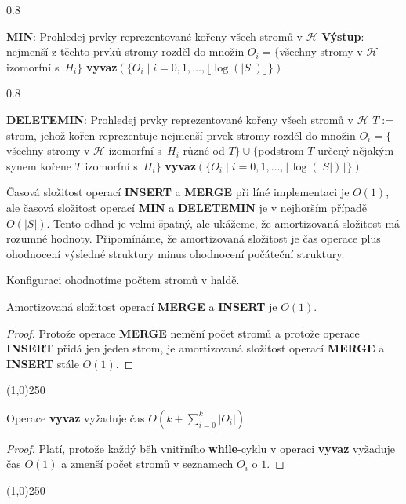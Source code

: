 \documentclass[a4paper,12pt]{article}
\newenvironment{myproof}{
  \begin{proof}
    
  }{
  \end{proof}
  \begin{center}
   \line(1,0){250}
   \end{center}
  }
\newcommand{\algoritmus}[1]{
  {
  \setlength\fboxrule{0.5pt}

  \begin{boxedminipage}{0.8\textwidth}

 #1
  \end{boxedminipage}

  }
  }
\begin{document}
\algoritmus{{\bf MIN}:\newline 
Prohledej prvky reprezentované kořeny všech 
stromů  
v $\mathcal H$\newline 
{\bf Výstup}: nejmenší z těchto prvků\newline 
stromy rozděl do množin $O_i=\{$všechny stromy v 
$\mathcal H$ izomorfní s~$H_i\}$\newline 
{\bf vyvaz$(\{O_i\mid i=0,1,\dots,\lfloor\log(|S|)\rfloor \})$}}

\algoritmus{{\bf
DELETEMIN}:\newline 
Prohledej prvky reprezentované kořeny všech 
stromů v $\mathcal H$\newline 
$T:=$ strom, jehož kořen repre\-zentuje nejmenší 
prvek\newline 
stromy rozděl do množin $O_i=\{$všechny stromy v 
$\mathcal H$ izomorfní s~$H_i$ různé od $T\}\cup \{$podstrom $
T$ určený nějakým synem kořene $T$ 
izomorfní s~$H_i\}$\newline 
{\bf vyvaz$(\{O_i\mid i=0,1,\dots,\lfloor\log(|S|)\rfloor \})$
}}

Časová složitost operací {\bf INSERT} a {\bf MER\-GE} při líné 
implementaci je $O(1)$, ale časová složitost operací {\bf MIN} a 
{\bf DELETEMIN} je v nejhorším případě $O(|S|)$. Tento odhad je 
velmi špatný, ale ukážeme, že amortizovaná složitost má rozumné 
hodnoty. 
Připomínáme, že amortizovaná složi\-tost je čas operace plus 
ohodnocení výsledné struktury minus ohodnocení 
počáteční struktury. 

Konfiguraci ohodnotíme počtem stromů v 
haldě. 

\begin{tvrzeni}
    Amortizovaná složitost operací {\bf MERGE} a {\bf INSERT} je $
    O(1)$.
\end{tvrzeni}

\begin{myproof}
Protože ope\-race {\bf MERGE} nemění počet stromů a 
protože operace {\bf INSERT} přidá jen jeden strom, je 
amortizovaná složitost operací {\bf MERGE} a {\bf INSERT} stále $
O(1)$.\end{myproof}

\begin{lemma}
Ope\-ra\-ce {\bf vyvaz} vyžaduje čas $O(k+\sum_{i=0}^k|O_i|
)$
\end{lemma}
\begin{myproof}
    Platí, protože každý běh 
    vnitřního {\bf while}-cyklu v operaci {\bf vyvaz} vyžaduje čas $
    O(1)$ 
    a zmenší počet stromů v seznamech $O_i$ o $1$.
\end{myproof}
\end{document}
